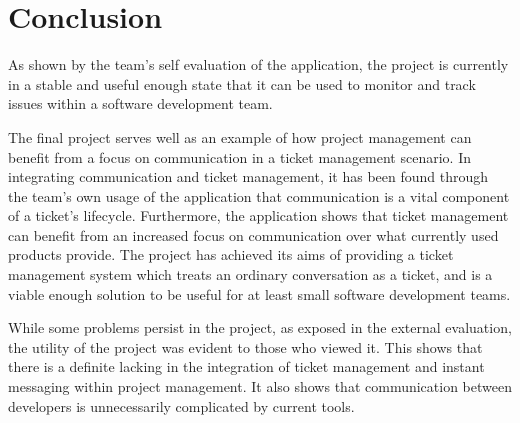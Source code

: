 \documentclass[a4paper]{l3proj}
\begin{document}
\chapter{Conclusion}
\label{conclusion}

As shown by the team’s self evaluation of the application, the project is currently in a stable and useful enough state that it can be used to monitor and track issues within a software development team. 

The final project serves well as an example of how project management can benefit from a focus on communication in a ticket management scenario. In integrating communication and ticket management, it has been found through the team’s own usage of the application that communication is a vital component of a ticket’s lifecycle. Furthermore, the application shows that ticket management can benefit from an increased focus on communication over what currently used products provide. The project has achieved its aims of providing a ticket management system which treats an ordinary conversation as a ticket, and is a viable enough solution to be useful for at least small software development teams. 

While some problems persist in the project, as exposed in the external evaluation, the utility of the project was evident to those who viewed it. This shows that there is a definite lacking in the integration of ticket management and instant messaging within project management. It also shows that communication between developers is unnecessarily complicated by current tools. 

{}

\end{document}
